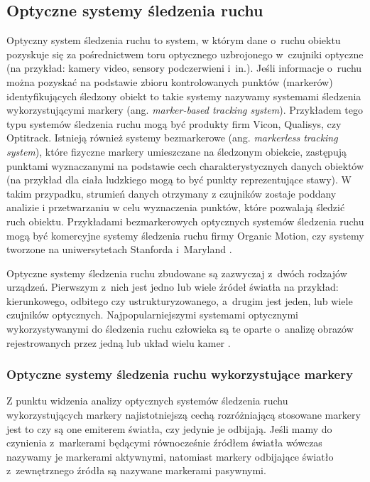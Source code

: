 \subsection{Optyczne systemy śledzenia ruchu}
Optyczny system śledzenia ruchu to system, w którym dane o~ruchu obiektu pozyskuje się za pośrednictwem toru optycznego uzbrojonego w~czujniki optyczne (na przykład: kamery video, sensory podczerwieni i~in.). Jeśli informacje o~ruchu można pozyskać na podstawie zbioru kontrolowanych punktów (markerów) identyfikujących śledzony obiekt to takie systemy nazywamy systemami śledzenia wykorzystującymi markery (ang. \textsl{marker-based tracking system}). Przykładem tego typu systemów śledzenia ruchu mogą być produkty firm Vicon{}, Qualisys{}, czy Optitrack{}. Istnieją również systemy bezmarkerowe (ang. \textsl{markerless tracking system}), które fizyczne markery umieszczane na śledzonym obiekcie, zastępują punktami wyznaczanymi na podstawie cech charakterystycznych danych obiektów (na przykład dla ciała ludzkiego mogą to być punkty reprezentujące stawy). W takim przypadku, strumień danych otrzymany z czujników zostaje poddany analizie i przetwarzaniu w celu wyznaczenia punktów, które pozwalają śledzić ruch obiektu. Przykładami bezmarkerowych optycznych systemów śledzenia ruchu mogą być komercyjne systemy śledzenia ruchu firmy Organic Motion{}, czy systemy tworzone na uniwersytetach Stanforda i~Maryland \cite{Sundaresan2005,Sundaresan2007}.

Optyczne systemy śledzenia ruchu zbudowane są zazwyczaj z~dwóch rodzajów urządzeń. Pierwszym z~nich jest jedno lub wiele źródeł światła na przykład: kierunkowego, odbitego czy ustrukturyzowanego, a~drugim jest jeden, lub wiele czujników optycznych. Najpopularniejszymi systemami optycznymi wykorzystywanymi do śledzenia ruchu człowieka są te oparte o~analizę obrazów rejestrowanych przez jedną \cite{schmidt2006kernel,RuiLi2006} lub układ wielu kamer \cite{Sundaresan2005,Krzeszowski2013}.

\subsubsection*{Optyczne systemy śledzenia ruchu wykorzystujące markery}
Z punktu widzenia analizy optycznych systemów śledzenia ruchu wykorzystujących markery najistotniejszą cechą rozróżniającą stosowane markery jest to czy są one emiterem światła, czy jedynie je odbijają. Jeśli mamy do czynienia z~markerami będącymi równocześnie źródłem światła wówczas nazywamy je markerami aktywnymi, natomiast markery odbijające światło z~zewnętrznego źródła są nazywane markerami pasywnymi.

